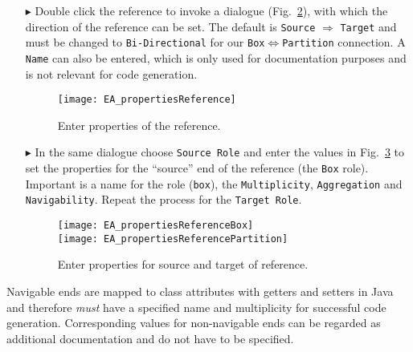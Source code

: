 \begin{enumerate}
Now click on the black arrow and pull to another element you wish to ``quick link" to.
In this case quick link from \texttt{Box} to \texttt{Partition}.
In the context-menu that pops-up, choose \texttt{EReference} (Fig.~\ref{fig:ereference}).

\begin{figure}[htbp]
	\centering
  \texttt{[image: EA\_quickLinkReference]}
	\caption{Create a reference via Quick Link.}
	\label{fig:ereference}
\end{figure}
\FloatBarrier

\item[$\blacktriangleright$] Double click the reference to invoke a dialogue (Fig.~\ref{fig:ereference_properties}), with which the direction of the reference can be set.
The default is \texttt{Source} $\Rightarrow$ \texttt{Target} and must be changed to \texttt{Bi-Directional} for our \texttt{Box}$\Leftrightarrow$\texttt{Partition} connection.
A \texttt{Name} can also be entered, which is only used for documentation purposes and is not relevant for code generation.

\begin{figure}[htbp]
	\centering
  \texttt{[image: EA\_propertiesReference]}
	\caption{Enter properties of the reference.}
	\label{fig:ereference_properties}
\end{figure}

\item[$\blacktriangleright$] In the same dialogue choose \texttt{Source Role} and enter the values in Fig.~\ref{fig:reference_ends} to set the properties for the ``source'' end of the reference (the \texttt{Box} role).
Important is a name for the role (\texttt{box}), the \texttt{Multiplicity}, \texttt{Aggregation} and \texttt{Navigability}.  Repeat the process for the \texttt{Target Role}.

\begin{figure}[htbp]
	\centering
  \texttt{[image: EA\_propertiesReferenceBox]}\\
  \vspace{0.2cm}
  \texttt{[image: EA\_propertiesReferencePartition]}
	\caption{Enter properties for source and target of reference.}
	\label{fig:reference_ends}
\end{figure}
\FloatBarrier
\end{enumerate}

Navigable ends are mapped to class attributes with getters and setters in Java and therefore \emph{must} have a specified name and  multiplicity for successful code generation.
Corresponding values for non-navigable ends can  be regarded as additional documentation and do not have to be specified.

